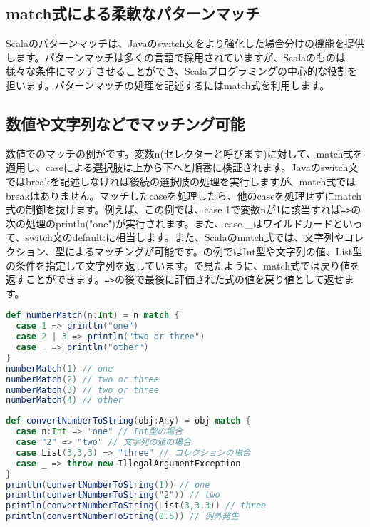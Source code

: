 \subsection{match式による柔軟なパターンマッチ}
Scalaのパターンマッチは、Javaのswitch文をより強化した場合分けの機能を提供します。パターンマッチは多くの言語で採用されていますが、Scalaのものは様々な条件にマッチさせることができ、Scalaプログラミングの中心的な役割を担います。パターンマッチの処理を記述するにはmatch式を利用します。

\subsection{数値や文字列などでマッチング可能}
数値でのマッチの例がです。変数n(セレクターと呼びます)に対して、match式を適用し、caseによる選択肢は上から下へと順番に検証されます。Javaのswitch文ではbreakを記述しなければ後続の選択肢の処理を実行しますが、match式ではbreakはありません。マッチしたcaseを処理したら、他のcaseを処理せずにmatch式の制御を抜けます。例えば、この例では、case 1で変数nが1に該当すれば\verb|=>|の次の処理のprintln("one")が実行されます。また、case \_はワイルドカードといって、switch文のdefault:に相当します。また、Scalaのmatch式では、文字列やコレクション、型によるマッチングが可能です。の例ではInt型や文字列の値、List型の条件を指定して文字列を返しています。で見たように、match式では戻り値を返すことができます。\verb|=>|の後で最後に評価された式の値を戻り値として返せます。

\begin{lstlisting}[language=scala, label=src:digit_matching, caption=数値のマッチングの例]
def numberMatch(n:Int) = n match {
  case 1 => println("one")
  case 2 | 3 => println("two or three")
  case _ => println("other")
}
numberMatch(1) // one
numberMatch(2) // two or three
numberMatch(3) // two or three
numberMatch(4) // other
\end{lstlisting}

\begin{lstlisting}[language=scala, label=src:match_expression, caption=match式は値を返す]
def convertNumberToString(obj:Any) = obj match {
  case n:Int => "one" // Int型の場合
  case "2" => "two" // 文字列の値の場合
  case List(3,3,3) => "three" // コレクションの場合
  case _ => throw new IllegalArgumentException
}
println(convertNumberToString(1)) // one
println(convertNumberToString("2")) // two
println(convertNumberToString(List(3,3,3)) // three
println(convertNumberToString(0.5)) // 例外発生
\end{lstlisting}

